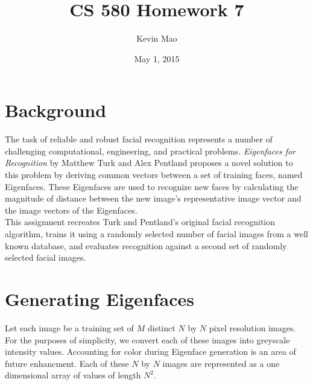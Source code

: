 \documentclass[11pt]{article}
\begin{document}
\title{CS 580 Homework 7}
\author{Kevin Mao}
\date{May 1, 2015}
\maketitle

\section*{Background}

The task of reliable and robust facial recognition represents a number of challenging computational, engineering, and practical problems. \textit{Eigenfaces for Recognition} by Matthew Turk and Alex Pentland proposes a novel solution to this problem by deriving common vectors between a set of training faces, named Eigenfaces. These Eigenfaces are used to recognize new faces by calculating the magnitude of distance between the new image's representative image vector and the image vectors of the Eigenfaces.\\

\noindent
This assignment recreates Turk and Pentland's original facial recognition algorithm, trains it using a randomly selected number of facial images from a well known database, and evaluates recognition against a second set of randomly selected facial images.

\section*{Generating Eigenfaces}
Let each image be a training set of $M$ distinct $N$ by $N$ pixel resolution images. For the purposes of simplicity, we convert each of these images into greyscale intensity values. Accounting for color during Eigenface generation is an area of future enhancment. Each of these $N$ by $N$ images are represented as a one dimensional array of values of length $N^2$. 
\end{document}
